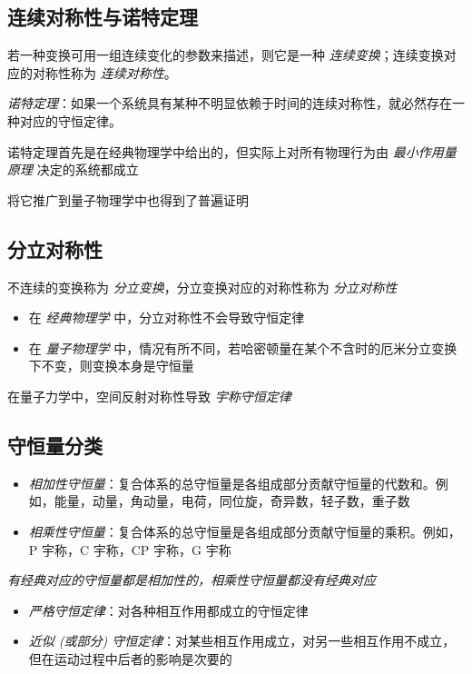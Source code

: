 \documentclass[oneside,a4paper,openany,11pt]{ctexbook}
\begin{document}
\subsection{连续对称性与诺特定理}

若一种变换可用一组连续变化的参数来描述，则它是一种 \emph{连续变换}；连续变换对应的对称性称为 \emph{连续对称性}。

\emph{诺特定理}：如果一个系统具有某种不明显依赖于时间的连续对称性，就必然存在一种对应的守恒定律。

诺特定理首先是在经典物理学中给出的，但实际上对所有物理行为由 \emph{最小作用量原理} 决定的系统都成立

将它推广到量子物理学中也得到了普遍证明

\subsection{分立对称性}

不连续的变换称为 \emph{分立变换}，分立变换对应的对称性称为 \emph{分立对称性}

\begin{itemize}
    \item 在 \emph{经典物理学} 中，分立对称性不会导致守恒定律
    \item 在 \emph{量子物理学} 中，情况有所不同，若哈密顿量在某个不含时的厄米分立变换下不变，则变换本身是守恒量
\end{itemize}

在量子力学中，空间反射对称性导致 \emph{宇称守恒定律}

\subsection{守恒量分类}

\begin{itemize}
    \item \emph{相加性守恒量}：复合体系的总守恒量是各组成部分贡献守恒量的代数和。例如，能量，动量，角动量，电荷，同位旋，奇异数，轻子数，重子数
    \item \emph{相乘性守恒量}：复合体系的总守恒量是各组成部分贡献守恒量的乘积。例如，P 宇称，C 宇称，CP 宇称，G 宇称
\end{itemize}

\emph{有经典对应的守恒量都是相加性的，相乘性守恒量都没有经典对应}

\begin{itemize}
    \item \emph{严格守恒定律}：对各种相互作用都成立的守恒定律
    \item \emph{近似 (或部分) 守恒定律}：对某些相互作用成立，对另一些相互作用不成立，但在运动过程中后者的影响是次要的
\end{itemize}
\end{document}
